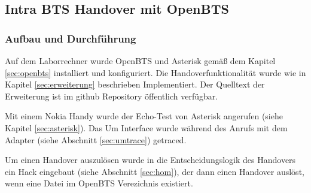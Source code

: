 \subsection{Intra BTS Handover mit OpenBTS}
\subsubsection{Aufbau und Durchführung}
Auf dem Laborrechner wurde OpenBTS und Asterisk gemäß dem Kapitel \ref{sec:openbts} installiert und konfiguriert. Die Handoverfunktionalität wurde wie in Kapitel \ref{sec:erweiterung} beschrieben Implementiert. Der Quelltext der Erweiterung ist im github Repository \cite{bib:openbtshandover} öffentlich verfügbar. 

Mit einem Nokia Handy wurde der Echo-Test von Asterisk angerufen (siehe Kapitel \ref{sec:asterisk}). Das Um Interface wurde während des Anrufs mit dem Adapter (siehe Abschnitt \ref{sec:umtrace}) getraced. 

Um einen Handover auszulösen wurde in die Entscheidungslogik des Handovers ein Hack eingebaut (siehe Abschnitt \ref{sec:hom}), der dann einen Handover auslöst, wenn eine Datei im OpenBTS Verezichnis existiert.










































